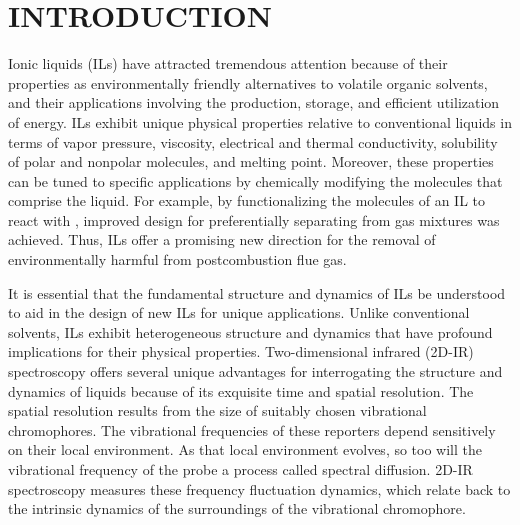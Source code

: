 \documentclass[%
  class = book,%
  crop = false,%
  float = true,%
  multi = true,%
  preview = false,%
]{standalone}
\let\cite\autocite
\newcommand{\caps}[1]{\uppercase{#1}}
\begin{document}
\section{\texorpdfstring{\caps{Introduction}}{Introduction}}
\label{paper_03:sec:I}

Ionic liquids (ILs) have attracted tremendous attention because of their properties as environmentally friendly alternatives to volatile organic solvents, and their applications involving the production, storage, and efficient utilization of energy.\cite{Karadas2010,wishartEES-09,Armand2009,Patel2012,baraACR-10} ILs exhibit unique physical properties relative to conventional liquids in terms of vapor pressure, viscosity, electrical and thermal conductivity, solubility of polar and nonpolar molecules, and melting point.\cite{baraACR-10,Crosthwaite2005,seki_effects_2010,Tokuda2005,anthonyJPCB-02} Moreover, these properties can be tuned to specific applications by chemically modifying the molecules that comprise the liquid. For example, by functionalizing the molecules of an IL to react with , improved design for preferentially separating  from gas mixtures was achieved.\cite{anthonyJPCB-02,seoJPCB-14,shiflett_solubilities_2005,Gurkan2010,Cadena2004} Thus, ILs offer a promising new direction for the removal of environmentally harmful  from postcombustion flue gas.

It is essential that the fundamental structure and dynamics of ILs be understood to aid in the design of new ILs for unique applications.  Unlike conventional solvents, ILs exhibit heterogeneous structure and dynamics that have profound implications for their physical properties.  Two-dimensional infrared (2D-IR) spectroscopy offers several unique advantages for interrogating the structure and dynamics of liquids because of its exquisite time and spatial resolution.\cite{Tamimi2016b,Ren2014,hamm_concepts_2011,khalil_coherent_2003} The spatial resolution results from the size of suitably chosen vibrational chromophores. The vibrational frequencies of these reporters depend sensitively on their local environment.\cite{Ren2014,levinson_phosphate_2011,choi_vibrational_2011,choiJCP-08,Lee2011,steinelCPL-04} As that local environment evolves, so too will the vibrational frequency of the probe \textemdash{} a process called spectral diffusion. 2D-IR spectroscopy measures these frequency fluctuation dynamics, which relate back to the intrinsic dynamics of the surroundings of the vibrational chromophore.
\end{document}
